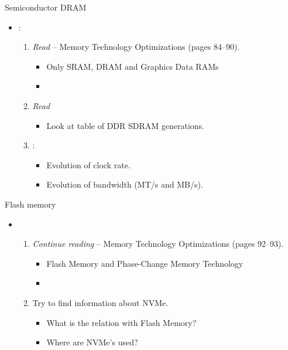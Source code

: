 \begin{frame}[t]{Semiconductor DRAM}
  \begin{itemize}
    \item {}:
      \begin{enumerate}
        \item \emph{Read}  -- 
              Memory Technology Optimizations (pages 84--90).
          \begin{itemize}
            \item Only SRAM, DRAM and Graphics Data RAMs
            \item \bibhennessy
          \end{itemize}

        \item \emph{Read} 
          \begin{itemize}
            \item Look at table of DDR SDRAM generations.
          \end{itemize}

        \item {}:
          \begin{itemize}
            \item Evolution of clock rate.
            \item Evolution of bandwidth (MT/s and MB/s).
          \end{itemize}
      \end{enumerate}
  \end{itemize}
\end{frame}

\begin{frame}[t]{Flash memory}
  \begin{itemize}
    \item {}
      \begin{enumerate}
        \item \emph{Continue reading}  -- 
              Memory Technology Optimizations (pages 92--93).
          \begin{itemize}
            \item Flash Memory and Phase-Change Memory Technology
            \item \bibhennessy
          \end{itemize}

        \item Try to find information about NVMe.
          \begin{itemize}
            \item What is the relation with Flash Memory?
            \item Where are NVMe's used?
          \end{itemize}
      \end{enumerate}
  \end{itemize}
\end{frame}

